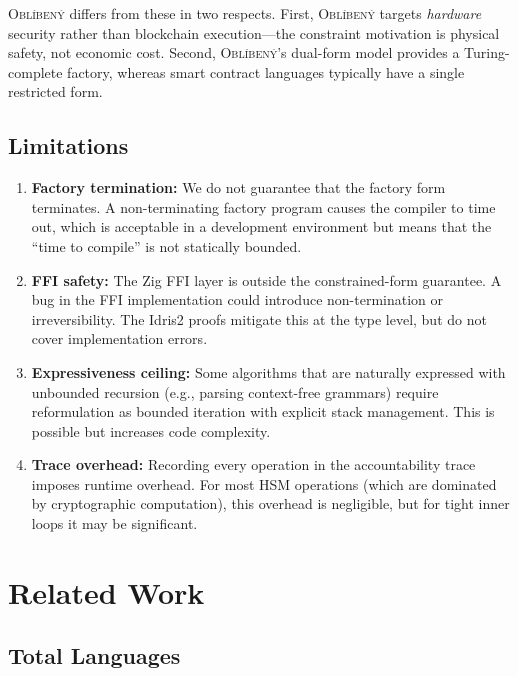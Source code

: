 \documentclass[11pt,a4paper]{article}
\newcommand{\obl}{\textsc{Obl\'{i}ben\'{y}}}
\begin{document}
\obl{} differs from these in two respects.  First, \obl{} targets
\emph{hardware} security rather than blockchain execution---the constraint
motivation is physical safety, not economic cost.  Second, \obl{}'s dual-form
model provides a Turing-complete factory, whereas smart contract languages
typically have a single restricted form.

\subsection{Limitations}

\begin{enumerate}[nosep]
  \item \textbf{Factory termination:}  We do not guarantee that the factory
    form terminates.  A non-terminating factory program causes the compiler
    to time out, which is acceptable in a development environment but means
    that the ``time to compile'' is not statically bounded.
  \item \textbf{FFI safety:}  The Zig FFI layer is outside the
    constrained-form guarantee.  A bug in the FFI implementation could
    introduce non-termination or irreversibility.  The Idris2 proofs mitigate
    this at the type level, but do not cover implementation errors.
  \item \textbf{Expressiveness ceiling:}  Some algorithms that are naturally
    expressed with unbounded recursion (e.g., parsing context-free grammars)
    require reformulation as bounded iteration with explicit stack management.
    This is possible but increases code complexity.
  \item \textbf{Trace overhead:}  Recording every operation in the
    accountability trace imposes runtime overhead.  For most HSM operations
    (which are dominated by cryptographic computation), this overhead is
    negligible, but for tight inner loops it may be significant.
\end{enumerate}


\section{Related Work}
\label{sec:related}

\subsection{Total Languages}
\end{document}
